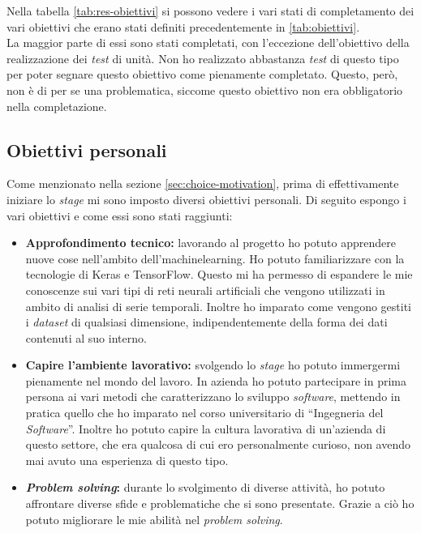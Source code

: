 Nella tabella \ref{tab:res-obiettivi} si possono vedere i vari stati di completamento dei vari obiettivi che erano stati definiti precedentemente in \ref{tab:obiettivi}.\\
La maggior parte di essi sono stati completati, con l'eccezione dell'obiettivo della realizzazione dei \textit{test} di unità.
Non ho realizzato abbastanza \textit{test} di questo tipo per poter segnare questo obiettivo come pienamente completato.
Questo, però, non è di per se una problematica, siccome questo obiettivo non era obbligatorio nella completazione.

\subsection{Obiettivi personali}\noindent
Come menzionato nella sezione \ref{sec:choice-motivation}, prima di effettivamente iniziare lo \textit{stage} mi sono imposto diversi obiettivi personali.
Di seguito espongo i vari obiettivi e come essi sono stati raggiunti:
\begin{itemize}
    \item \textbf{Approfondimento tecnico:} lavorando al progetto ho potuto apprendere nuove cose nell'ambito dell'\gls{machinelearning}. Ho potuto familiarizzare con la tecnologie di Keras e TensorFlow. Questo mi ha permesso di espandere le mie conoscenze sui vari tipi di reti neurali artificiali che vengono utilizzati in ambito di analisi di serie temporali. Inoltre ho imparato come vengono gestiti i \textit{dataset} di qualsiasi dimensione, indipendentemente della forma dei dati contenuti al suo interno.
    \item \textbf{Capire l'ambiente lavorativo:} svolgendo lo \textit{stage} ho potuto immergermi pienamente nel mondo del lavoro. In azienda ho potuto partecipare in prima persona ai vari metodi che caratterizzano lo sviluppo \textit{software}, mettendo in pratica quello che ho imparato nel corso universitario di ``Ingegneria del \textit{Software}''. Inoltre ho potuto capire la cultura lavorativa di un'azienda di questo settore, che era qualcosa di cui ero personalmente curioso, non avendo mai avuto una esperienza di questo tipo.
    \item \textbf{\textit{Problem solving}:} durante lo svolgimento di diverse attività, ho potuto affrontare diverse sfide e problematiche che si sono presentate. Grazie a ciò ho potuto migliorare le mie abilità nel \textit{problem solving}.
\end{itemize}


